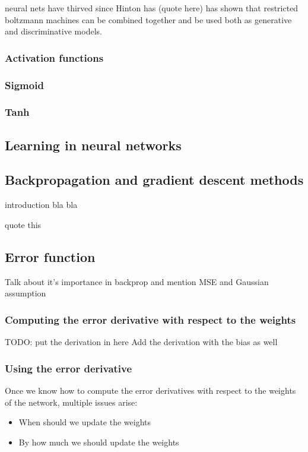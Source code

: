 \documentclass[11pt, fleqn, twoside]{article}
\begin{document}
 neural nets have thirved since Hinton has (quote here) has shown that restricted boltzmann machines can be combined together and be used both as generative and discriminative models.

\subsubsection{Activation functions}

\subsubsection{Sigmoid}

\subsubsection{Tanh}

\subsection{Learning in neural networks}

\subsection{Backpropagation and gradient descent methods}
  introduction bla bla

  quote this \cite{LeCun1998}

\subsection{Error function}
  Talk about it's importance in backprop and mention MSE and Gaussian assumption

\subsubsection {Computing the error derivative with respect to the weights}
  TODO: put the derivation in here
  Add the derivation with the  bias as well

\subsubsection {Using the error derivative}

  Once we know how to compute the error derivatives with respect to the weights of the network, multiple issues arise:

\begin{itemize}
    \item When should we update the weights
    \item By how much we should update the weights
\end{itemize}
\end{document}
